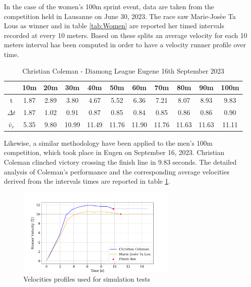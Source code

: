 \documentclass[a4paper,12pt,oneside]{book}
\begin{document}
In the case of the women's 100m sprint event, data are taken from the competition held in Lausanne on June 30, 2023.  
The race saw Marie-Josèe Ta Lous as winner and in table \ref{tab:Women} are reported her timed intervals recorded at every 10 meters. 
Based on these splits an average velocity for each 10 meters interval has been computed in order to have a velocity runner profile over time.

\begin{table}[h!]
	\centering
	\begin{adjustbox}{max width=\textwidth}
	\begin{tabular}{c|c|c|c|c|c|c|c|c|c|c}
           & 10m & 20m & 30m & 40m & 50m & 60m & 70m & 80m & 90m &100m \\
	\hline
	\hline
	t & 1.87 & 2.89 & 3.80 & 4.67 & 5.52 & 6.36 & 7.21 & 8.07 & 8.93 & 9.83  \\	
	$\Delta t$ & 1.87 & 1.02 & 0.91 & 0.87 & 0.85 & 0.84 & 0.85 & 0.86 & 0.86 & 0.90 \\
	$\bar{v}_r$ & 5.35 & 9.80 & 10.99 & 11.49 & 11.76 & 11.90 & 11.76 & 11.63 & 11.63 & 11.11 \\
	\hline
	\end{tabular}
	\end{adjustbox}
\caption{Christian Coleman - Diamong League Eugene 16th September 2023}
\label{tab:Man}
\end{table}

Likewise, a similar methodology have been applied to the men's 100m competition, which took place in Eugen on September 16, 2023.
Christian Coleman clinched victory crossing the finish line in 9.83 seconds.
The detailed analysis of Coleman's performance and the corresponding average velocities derived from the intervals times are reported in table \ref{tab:Man}.

\begin{figure}[!h]
	\centering
	\includegraphics[width=0.7\textwidth]{Test_Velocities.png}
\caption{Velocities profiles used for simulation tests}
\label{Test_Velocities}
\end{figure}
\end{document}

